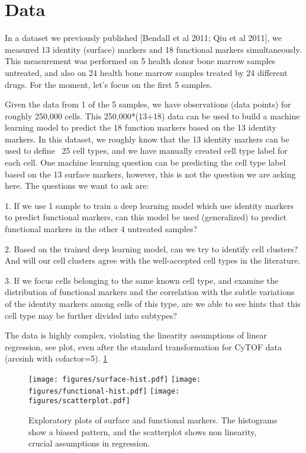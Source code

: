 \documentclass[graybox]{svmult}
\begin{document}
\section{Data}

In a dataset we previously published
[Bendall et al 2011; Qiu et al 2011], we measured 13 identity
(surface) markers and 18 functional markers simultaneously.  This
measurement was performed on 5 health donor bone marrow samples
untreated, and also on 24 health bone marrow samples treated by 24
different drugs.  For the moment, let’s focus on the first 5 samples.

Given the data from 1 of the 5 samples, we have observations (data
points) for roughly 250,000 cells. This 250,000*(13+18) data can be
used to build a machine learning model to predict the 18 function
markers based on the 13 identity markers. In this dataset, we roughly
know that the 13 identity markers can be used to define ~25 cell
types, and we have manually created cell type label for each cell. One
machine learning question can be predicting the cell type label based
on the 13 surface markers, however, this is not the question we are
asking here. The questions we want to ask are:

1. If we use 1 sample
to train a deep learning model which use identity markers to predict
functional markers, can this model be used (generalized) to predict
functional markers in the other 4 untreated samples?

2. Based on the
trained deep learning model, can we try to identify cell clusters? And
will our cell clusters agree with the well-accepted cell types in the
literature.

3. If we focus cells belonging to the same known cell
type, and examine the distribution of functional markers and the
correlation with the subtle variations of the identity markers among
cells of this type, are we able to see hints that this cell type may
be further divided into subtypes?

The data is highly complex, violating the linearity assumptions of
linear regression, see plot, even after the standard transformation
for CyTOF data (arcsinh with cofactor=5). \ref{exploratory}

\begin{figure}
\texttt{[image: figures/surface-hist.pdf]}
\texttt{[image: figures/functional-hist.pdf]}
\texttt{[image: figures/scatterplot.pdf]}
\caption{Exploratory plots of surface and functional markers. The
  histograms show a biased pattern, and the scatterplot shows non
  linearity, crucial assumptions in regression.}
\label{exploratory}
\end{figure}
\end{document}
